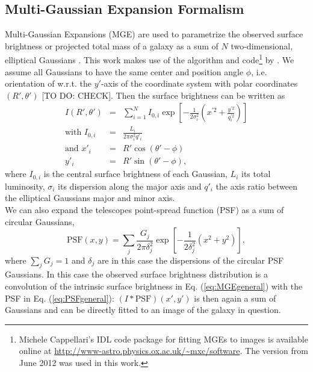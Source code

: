 \subsection{Multi-Gaussian Expansion Formalism} \label{sec:MGE_theo}

Multi-Gaussian Expansions (MGE) are used to parametrize the observed surface brightness or projected total mass of a galaxy as a sum of $N$ two-dimensional, elliptical Gaussians \citep{1991ApJ...366..599B,1992A&A...253..366M,1994A&A...285..723E,1999MNRAS.303..495E}. This work makes use of the algorithm and code\footnote{Michele Cappellari's IDL code package for fitting MGEs to images is available online at \url{http://www-astro.physics.ox.ac.uk/~mxc/software}. The version from June 2012 was used in this work.} by \citet{Cap02}. We assume all Gaussians to have the same center and position angle $\phi$, i.e. orientation of w.r.t. the $y'$-axis of the coordinate system with polar coordinates $(R',\theta')$ [TO DO: CHECK]. Then the surface brightness can be written as
\begin{eqnarray}
I(R',\theta') &=& \sum_{i=1}^{N} I_{0,i} \exp\left[ - \frac{1}{2\sigma_i^2} \left(x^{'2} + \frac{y^{'2}}{q_i^{'2}}\right)\right]\label{eq:MGEgeneral}\\
\text{with } I_{0,i} &=& \frac{L_i}{2\pi \sigma_i^2 q'_i}\label{eq:centralItotalL}\\
\text{and } x'_i &=& R' \cos(\theta' - \phi)\nonumber\\
y'_i &=& R' \sin(\theta' - \phi),\nonumber
\end{eqnarray}
where $I_{0,i}$ is the central surface brightness of each Gaussian, $L_i$ its total luminosity, $\sigma_i$ its dispersion along the major axis and $q'_i$ the axis ratio between the elliptical Gaussians major and minor axis.
\\We can also expand the telescopes point-spread function (PSF) as a sum of circular Gaussians,
\begin{equation}
\text{PSF}(x,y) = \sum_j \frac{G_j}{2 \pi \delta_j^2} \exp\left[- \frac{1}{2 \delta_j^2} \left(x^2 + y^2 \right)\right], \label{eq:PSFgeneral}
\end{equation}
where $\sum_j G_j = 1$ and $\delta_j$ are in this case the dispersions of the circular PSF Gaussians. In this case the observed surface brightness distribution is a convolution of the intrinsic surface brightness in Eq. (\ref{eq:MGEgeneral}) with the PSF in Eq. (\ref{eq:PSFgeneral}): $(I \ast \text{PSF}) (x',y')$ is then again a sum of Gaussians and can be directly fitted to an image of the galaxy in question.

